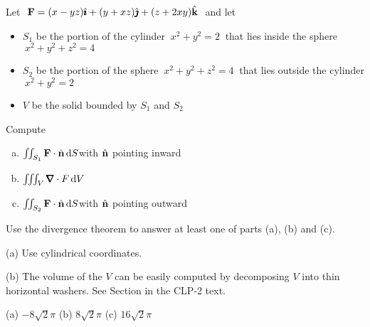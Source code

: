 \begin{question}
 Let $\ \vF=(x-yz)\hi+(y+xz)\hj+(z+2xy)\hk\ $ and let
\begin{itemize}\itemsep1pt \parskip0pt  %
\item 
$S_1$ be the portion of the cylinder $\ x^2+y^2=2\ $ that lies 
inside the sphere $\ x^2+y^2+z^2=4$
\item
$S_2$ be the portion of the sphere  $\ x^2+y^2+z^2=4\ $ that lies 
outside the cylinder $\ x^2+y^2=2\ $
\item
$V$ be the solid bounded by $S_1$ and $S_2$
\end{itemize}
Compute
\begin{enumerate}[(a)]
\item 
$\iint_{S_1}\mathbf{F}\cdot \hat{\mathbf{n}}\,\mathrm{d}S$\quad\quad with $\hat{\mathbf{n}}$ pointing inward
\item
$\tripInt_V\vnabla\cdot F\,\dee{V}$
\item
$\iint_{S_2}\mathbf{F}\cdot \hat{\mathbf{n}}\,\mathrm{d}S$\quad\quad with $\hat{\mathbf{n}}$ pointing outward
\end{enumerate}
Use the divergence theorem to answer at least one of parts (a), (b) and (c).
\end{question}

\begin{hint} 
(a) Use cylindrical coordinates.

(b) The volume of the $V$ can be easily computed by decomposing $V$
into thin horizontal washers. See Section 
in the CLP-2 text.

\end{hint}

\begin{answer} 
(a) $-8\sqrt{2}\pi$\qquad
(b) $8\sqrt{2}\pi$\qquad
(c) $16\sqrt{2}\pi$
\end{answer}

